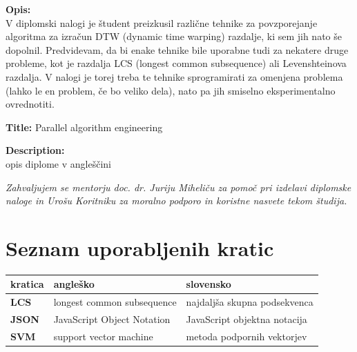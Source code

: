 \documentclass[a4paper,12pt,openright]{book}
\newcommand{\clearemptydoublepage}{\newpage{\pagestyle{empty}\cleardoublepage}}
\begin{document}
\bigskip
\noindent\textbf{Opis:}\\
V diplomski nalogi \cite{diplomaPremk} je študent preizkusil različne tehnike za povzporejanje algoritma za izračun DTW (dynamic time warping) razdalje, ki sem jih nato še dopolnil. Predvidevam, da bi enake tehnike bile uporabne tudi za nekatere druge probleme, kot je razdalja LCS (longest common subsequence) ali Levenshteinova razdalja. V nalogi je torej treba te tehnike sprogramirati za omenjena problema (lahko le en problem, če bo veliko dela), nato pa jih smiselno eksperimentalno ovrednotiti.

\bigskip
\noindent\textbf{Title:} Parallel algorithm engineering

\bigskip
\noindent\textbf{Description:}\\
opis diplome v angleščini

\vfill



\vspace{2cm}

\clearemptydoublepage

\thispagestyle{empty}\mbox{}\vfill\null\it%
\noindent
Zahvaljujem se mentorju doc. dr. Juriju Miheliču za pomoč pri izdelavi diplomske naloge in Urošu Koritniku za moralno podporo in koristne nasvete tekom študija. 
\rm\normalfont

\clearemptydoublepage

\thispagestyle{empty}\mbox{}{\textheight}\mbox{}\hfill\begin{minipage}{0.55\textwidth}%
\normalfont\end{minipage}

\clearemptydoublepage


\pagestyle{empty}
\def\thepage{}%
\tableofcontents{}


\clearemptydoublepage


\chapter*{Seznam uporabljenih kratic}

\noindent\begin{tabular}{p{}|p{}|p{}}    %
  {\bf kratica} & {\bf angleško}                              & {\bf slovensko} \\ \hline
  {\bf LCS}      & longest common subsequence               & najdaljša skupna podsekvenca \\
  {\bf JSON} & JavaScript Object Notation & JavaScript objektna notacija \\
  {\bf SVM}   & support vector machine              & metoda podpornih vektorjev \\
\end{tabular}
\end{document}
